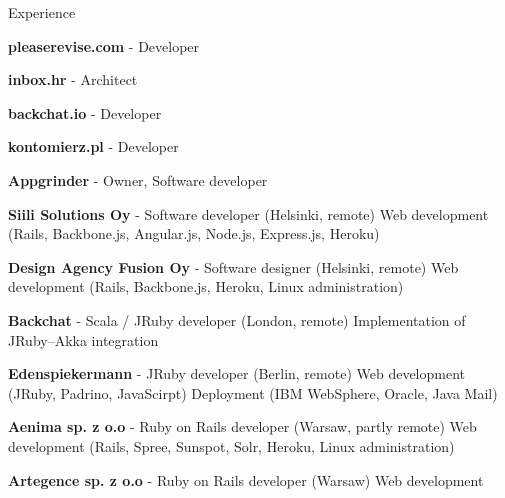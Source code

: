 
\begin{rubric}{Experience}


\entry*[01.2013--\ldots]
  \textbf{pleaserevise.com} - Developer

\entry*[10.2012--\ldots]
  \textbf{inbox.hr} - Architect

\entry*[12.2011--01.2012]
  \textbf{backchat.io} - Developer

\entry*[03.2010--10.2010]
  \textbf{kontomierz.pl} - Developer


\entry*[10.2010--\ldots]
  \textbf{Appgrinder} - Owner, Software developer

\entry*[07.2012--\ldots]
  \textbf{Siili Solutions Oy} - Software developer (Helsinki, remote)
\entry*
  Web development (Rails, Backbone.js, Angular.js, Node.js, Express.js, Heroku)

\entry*[07.2011--06.2012]
  \textbf{Design Agency Fusion Oy} - Software designer (Helsinki, remote)
\entry*
  Web development (Rails, Backbone.js, Heroku, Linux administration)

\entry*[12.2011--01.2012]
  \textbf{Backchat} - Scala / JRuby developer (London, remote)
\entry*
  Implementation of JRuby--Akka integration

\entry*[03.2011--05.2011]
  \textbf{Edenspiekermann} - JRuby developer (Berlin, remote)
\entry*
  Web development (JRuby, Padrino, JavaScirpt)
\entry*
  Deployment (IBM WebSphere, Oracle, Java Mail)

\entry*[10.2010--06.2011]
  \textbf{Aenima sp. z o.o} - Ruby on Rails developer (Warsaw, partly remote)
\entry*
  Web development (Rails, Spree, Sunspot, Solr, Heroku, Linux administration)

\entry*[03.2010--10.2010]
  \textbf{Artegence sp. z o.o} - Ruby on Rails developer (Warsaw)
\entry*
  Web development

\end{rubric}
